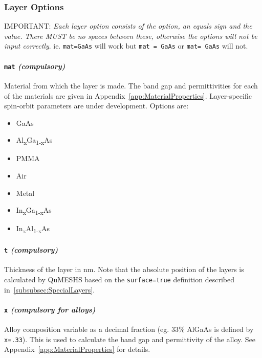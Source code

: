 \documentclass[12pt]{article}
\begin{document}
\subsubsection{Layer Options}
\label{subsubsec:LayerOptions}

{\color{red}IMPORTANT:} \emph{Each layer option consists of the option, an equals sign and the value.
There MUST be no spaces between these, otherwise the options will not be input correctly}.
ie. \texttt{mat=GaAs} will work but \texttt{mat = GaAs} or \texttt{mat= GaAs} will not.

\paragraph{\texttt{mat} \emph{(compulsory)}}
Material from which the layer is made.  The band gap and permittivities for each of the
materials are given in Appendix~\ref{app:MaterialProperties}.  Layer-specific spin-orbit
parameters are under development.   Options are:

\begin{itemize}
    \item{GaAs}
    \item{Al\textsubscript{x}Ga\textsubscript{1-x}As}
    \item{PMMA}
    \item{Air}
    \item{Metal}
    \item{In\textsubscript{x}Ga\textsubscript{1-x}As}
    \item{In\textsubscript{x}Al\textsubscript{1-x}As}
\end{itemize}

\paragraph{\texttt{t} \emph{(compulsory)}}
Thickness of the layer in nm.  Note that the absolute position of the layers is calculated
by QuMESHS based on the \texttt{surface=true} definition described
in~\ref{subsubsec:SpecialLayers}.

\paragraph{\texttt{x} \emph{(compulsory for alloys)}}
Alloy composition variable as a decimal fraction (eg. 33\% AlGaAs is defined by \texttt{x=.33}).
This is used to calculate the band gap and permittivity of the alloy.  See
Appendix~\ref{app:MaterialProperties} for details.
\end{document}
